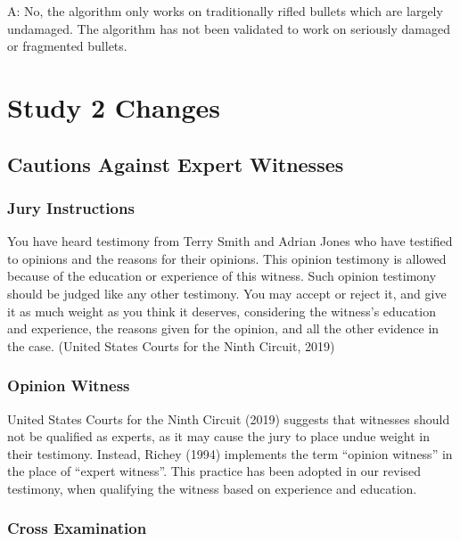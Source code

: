 \documentclass[print]{nuthesis}
\begin{document}
A: No, the algorithm only works on traditionally rifled bullets which are largely undamaged.
The algorithm has not been validated to work on seriously damaged or fragmented bullets.

\hypertarget{study-2-changes}{%
\chapter{Study 2 Changes}\label{study-2-changes}}

\hypertarget{cautions-against-expert-witnesses}{%
\section{Cautions Against Expert Witnesses}\label{cautions-against-expert-witnesses}}

\hypertarget{jury-instructions}{%
\subsection{Jury Instructions}\label{jury-instructions}}

You have heard testimony from Terry Smith and Adrian Jones who have testified to opinions and the reasons for their opinions. This opinion testimony is allowed because of the education or experience of this witness.
Such opinion testimony should be judged like any other testimony.
You may accept or reject it, and give it as much weight as you think it deserves, considering the witness's education and experience, the reasons given for the opinion, and all the other evidence in the case. (United States Courts for the Ninth Circuit, 2019)

\hypertarget{opinion-witness}{%
\subsection{Opinion Witness}\label{opinion-witness}}

United States Courts for the Ninth Circuit (2019) suggests that witnesses should not be qualified as experts, as it may cause the jury to place undue weight in their testimony. Instead, Richey (1994) implements the term ``opinion witness'' in the place of ``expert witness''. This practice has been adopted in our revised testimony, when qualifying the witness based on experience and education.

\hypertarget{cross-examination}{%
\subsection{Cross Examination}\label{cross-examination}}
\end{document}
